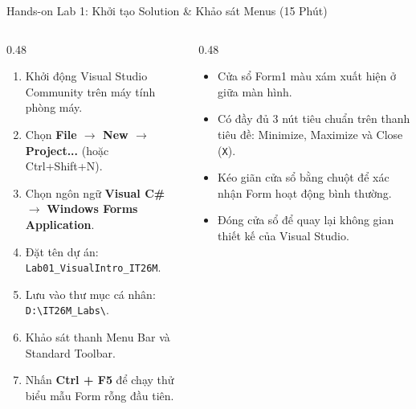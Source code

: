 \documentclass[aspectratio=169, 10pt]{beamer}
\begin{document}
\begin{frame}{Hands-on Lab 1: Khởi tạo Solution \& Khảo sát Menus (15 Phút)}
  \begin{columns}[T]
    \begin{column}{0.48\textwidth}
      \begin{tcolorbox}[colback=UniGreen!5,colframe=UniGreen,title=\textbf{NHIỆM VỤ THỰC HÀNH TẠI PHÒNG MÁY:},fonttitle=\small\bfseries]
        \begin{enumerate}\small
          \item Khởi động Visual Studio Community trên máy tính phòng máy.
          \item Chọn \textbf{File $\to$ New $\to$ Project...} (hoặc Ctrl+Shift+N).
          \item Chọn ngôn ngữ \textbf{Visual C\#} $\to$ \textbf{Windows Forms Application}.
          \item Đặt tên dự án: \texttt{Lab01\_VisualIntro\_IT26M}.
          \item Lưu vào thư mục cá nhân: \texttt{D:\textbackslash IT26M\_Labs\textbackslash}.
          \item Khảo sát thanh Menu Bar và Standard Toolbar.
          \item Nhấn \textbf{Ctrl + F5} để chạy thử biểu mẫu Form rỗng đầu tiên.
        \end{enumerate}
      \end{tcolorbox}
    \end{column}

    \begin{column}{0.48\textwidth}
      \begin{tcolorbox}[colback=UniNavy!5,colframe=UniNavy,title=\textbf{KẾT QUẢ MONG ĐỢI:},fonttitle=\small\bfseries]
        \begin{itemize}\small
          \item Cửa sổ Form1 màu xám xuất hiện ở giữa màn hình.
          \item Có đầy đủ 3 nút tiêu chuẩn trên thanh tiêu đề: Minimize, Maximize và Close (\texttt{X}).
          \item Kéo giãn cửa sổ bằng chuột để xác nhận Form hoạt động bình thường.
          \item Đóng cửa sổ để quay lại không gian thiết kế của Visual Studio.
        \end{itemize}
      \end{tcolorbox}
    \end{column}
  \end{columns}
\end{frame}
\end{document}
